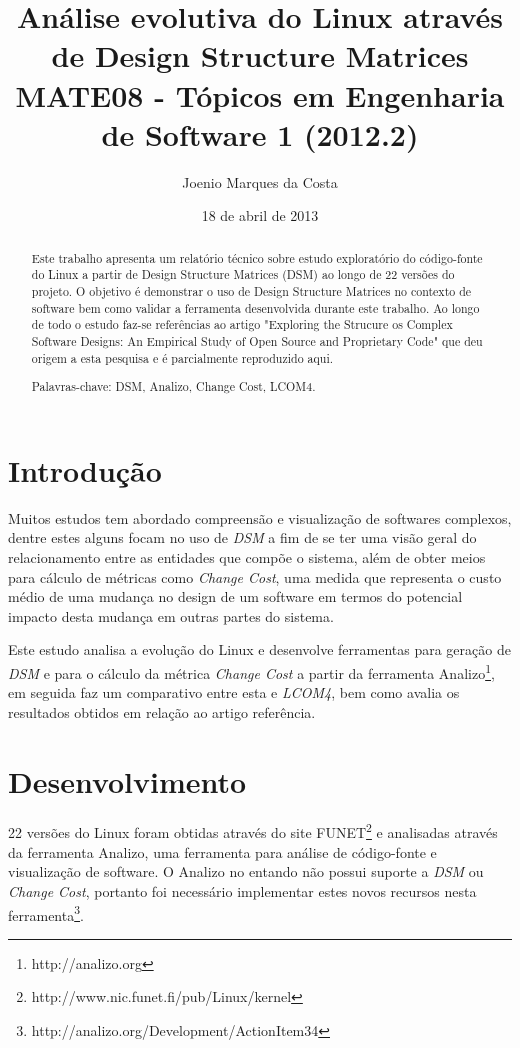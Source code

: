 \documentclass[conference]{IEEEtran}
\title{Análise evolutiva do Linux através de Design Structure Matrices\\
  \large MATE08 - Tópicos em Engenharia de Software 1 (2012.2)}
\author{Joenio Marques da Costa}
\date{18 de abril de 2013}
\begin{document}
\maketitle

\begin{abstract}
  Este trabalho apresenta um relatório técnico sobre estudo exploratório do
  código-fonte do Linux\cite{WikipediaLinux} a partir de Design Structure
  Matrices (DSM) ao longo de 22 versões do projeto. O objetivo é demonstrar o
  uso de Design Structure Matrices no contexto de software bem como validar a
  ferramenta desenvolvida durante este trabalho. Ao longo de todo o estudo
  faz-se referências ao artigo "Exploring the Strucure os Complex Software
  Designs: An Empirical Study of Open Source and Proprietary
  Code"\cite{ExploringStructure} que deu origem a esta pesquisa e é
  parcialmente reproduzido aqui.

  Palavras-chave: DSM, Analizo, Change Cost, LCOM4.
\end{abstract}

\section{Introdução}

Muitos estudos tem abordado compreensão e visualização de softwares complexos,
dentre estes alguns focam no uso de {\it DSM} a fim de se ter uma visão geral
do relacionamento entre as entidades que compõe o sistema, além de obter meios
para cálculo de métricas como {\it Change Cost}, uma medida que representa o
custo médio de uma mudança no design de um software em termos do potencial
impacto desta mudança em outras partes do sistema.

Este estudo analisa a evolução do Linux e desenvolve ferramentas para geração
de {\it DSM} e para o cálculo da métrica {\it Change Cost} a partir da
ferramenta Analizo\footnote{http://analizo.org}, em seguida faz um comparativo
entre esta e {\it LCOM4}\cite{measuringCouplingAndCohesion}, bem como avalia
os resultados obtidos em relação ao artigo
referência\cite{ExploringStructure}.

\section{Desenvolvimento}

22 versões do Linux foram obtidas através do site
FUNET\footnote{http://www.nic.funet.fi/pub/Linux/kernel} e analisadas através
da ferramenta Analizo\cite{Analizo}, uma ferramenta para análise de código-fonte e
visualização de software. O Analizo no entando não possui suporte a {\it DSM}
ou {\it Change Cost}, portanto foi necessário implementar estes novos recursos
nesta ferramenta\footnote{http://analizo.org/Development/ActionItem34}.
\end{document}
